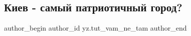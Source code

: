  
 
 
 
 
\subsection{Киев - самый патриотичный город?}
\label{sec:28_12_2021.yz.tut_vam_ne_tam.1.kiev_patriotichnyj_gorod}

\ifcmt
 author_begin
   author_id yz.tut_vam_ne_tam
 author_end
\fi

